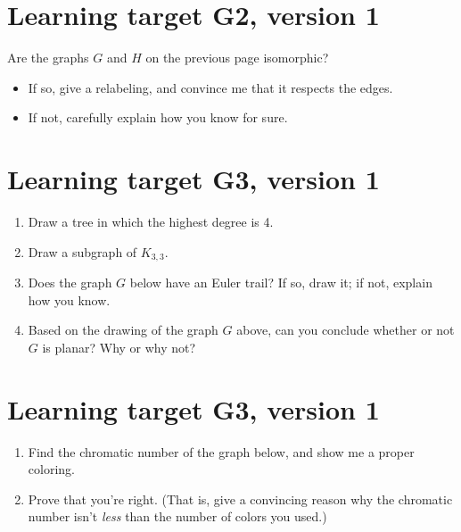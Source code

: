 \pagebreak
\section{Learning target G2, version 1}
Are the graphs $G$ and $H$ on the previous page isomorphic? 
\begin{itemize}
    \item If so, give a relabeling, and convince me that it respects the edges.
    \item If not, carefully explain how you know for sure.
\end{itemize}

\pagebreak
\section{Learning target G3, version 1}

\begin{enumerate}
    \item Draw a tree in which the highest degree is 4.
    
    \vfill
    \item Draw a subgraph of $K_{3,3}$.

    \vfill
    \item Does the graph $G$ below have an Euler trail? If so, draw it; if not, explain how you know.
    \item Based on the drawing of the graph $G$ above, can you conclude whether or not $G$ is planar? Why or why not?
\end{enumerate}

\pagebreak
\section{Learning target G3, version 1}
\begin{enumerate}
    \item Find the chromatic number of the graph below, and show me a proper coloring.
    \begin{center}
    \end{center}
    \item Prove that you're right. (That is, give a convincing reason why the chromatic number isn't \textit{less} than the number of colors you used.)
\end{enumerate}

